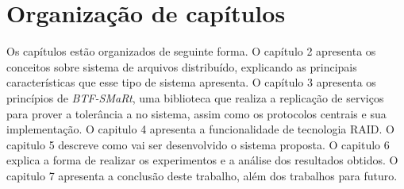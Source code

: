 
	\section{Organização de capítulos}
	
	Os capítulos estão organizados de seguinte forma. 
	O capítulo 2 apresenta os conceitos sobre sistema de arquivos distribuído, explicando as principais características que esse tipo de sistema apresenta.  
	O capítulo 3 apresenta os princípios de \textit{BTF-SMaRt}, uma biblioteca que realiza a replicação de serviços para prover a tolerância a no sistema, assim como os protocolos centrais e sua implementação.
	O capitulo 4 apresenta a funcionalidade de tecnologia RAID.
	O capitulo 5 descreve como vai ser desenvolvido o sistema proposta.
	O capitulo 6 explica a forma de realizar os experimentos e a análise dos resultados obtidos.
	O capitulo 7 apresenta a conclusão deste trabalho, além dos trabalhos para futuro.

